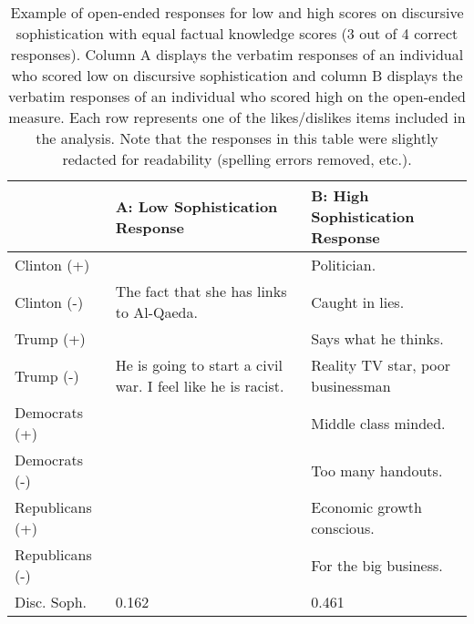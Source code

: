 \begin{table}[ht]\footnotesize\centering
\begin{tabular}{l|p{6.3cm}|p{6.3cm}}
\toprule
	& A: Low Sophistication Response & B: High Sophistication Response \\ \midrule
Clinton (+)		& 																& Politician. \\\hdashline
Clinton (-)		& The fact that she has links to Al-Qaeda. 						& Caught in lies. \\\hdashline
Trump (+)		& 																& Says what he thinks. \\\hdashline
Trump (-)		& He is going to start a civil war. I feel like he is racist. 	& Reality TV star, poor businessman \\\hdashline
Democrats (+)	& 																& Middle class minded. \\\hdashline
Democrats (-)	& 																& Too many handouts. \\\hdashline
Republicans (+)	& 																& Economic growth conscious. \\\hdashline
Republicans (-)	& 																& For the big business. \\\midrule
Disc. Soph. 	& 0.162 														& 0.461 \\\bottomrule
 \end{tabular}
\caption[Example of open-ended responses for low and high scores on discursive sophistication]{Example of open-ended responses for low and high scores on discursive sophistication with equal factual knowledge scores (3 out of 4 correct responses). Column A displays the verbatim responses of an individual who scored low on discursive sophistication and column B displays the verbatim responses of an individual who scored high on the open-ended measure. Each row represents one of the likes/dislikes items included in the analysis. Note that the responses in this table were slightly redacted for readability (spelling errors removed, etc.).}\label{tab:ex1}
\end{table}

